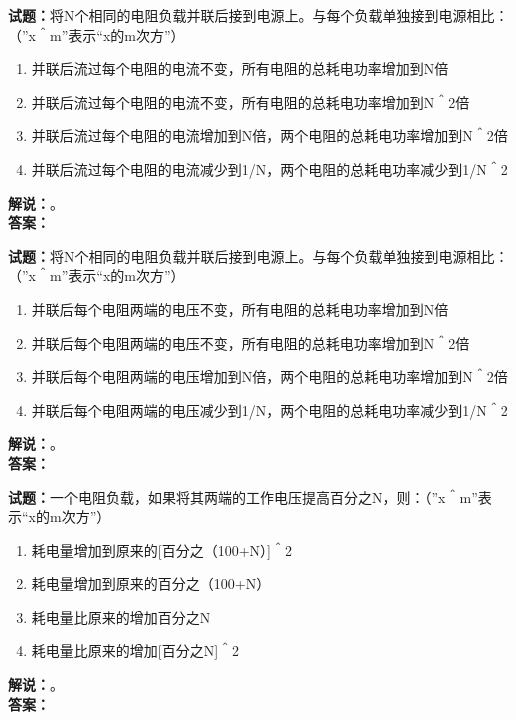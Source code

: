 \documentclass{ctexbook}
\begin{document}
\bigskip




\noindent\textbf{试题：}将N个相同的电阻负载并联后接到电源上。与每个负载单独接到电源相比：（”x＾m”表示“x的m次方”）
\begin{enumerate}[leftmargin=3em]
\item 并联后流过每个电阻的电流不变，所有电阻的总耗电功率增加到N倍
\item 并联后流过每个电阻的电流不变，所有电阻的总耗电功率增加到N＾2倍
\item 并联后流过每个电阻的电流增加到N倍，两个电阻的总耗电功率增加到N＾2倍
\item 并联后流过每个电阻的电流减少到1/N，两个电阻的总耗电功率减少到1/N＾2
\end{enumerate}
\noindent\textbf{解说：}\textbf{}。\\\noindent\textbf{答案：}

\bigskip




\noindent\textbf{试题：}将N个相同的电阻负载并联后接到电源上。与每个负载单独接到电源相比：（”x＾m”表示“x的m次方”）
\begin{enumerate}[leftmargin=3em]
\item 并联后每个电阻两端的电压不变，所有电阻的总耗电功率增加到N倍
\item 并联后每个电阻两端的电压不变，所有电阻的总耗电功率增加到N＾2倍
\item 并联后每个电阻两端的电压增加到N倍，两个电阻的总耗电功率增加到N＾2倍
\item 并联后每个电阻两端的电压减少到1/N，两个电阻的总耗电功率减少到1/N＾2
\end{enumerate}
\noindent\textbf{解说：}\textbf{}。\\\noindent\textbf{答案：}

\bigskip




\noindent\textbf{试题：}一个电阻负载，如果将其两端的工作电压提高百分之N，则：（”x＾m”表示“x的m次方”）
\begin{enumerate}[leftmargin=3em]
\item 耗电量增加到原来的[百分之（100+N）]＾2
\item 耗电量增加到原来的百分之（100+N）
\item 耗电量比原来的增加百分之N
\item 耗电量比原来的增加[百分之N]＾2
\end{enumerate}
\noindent\textbf{解说：}\textbf{}。\\\noindent\textbf{答案：}
\end{document}

